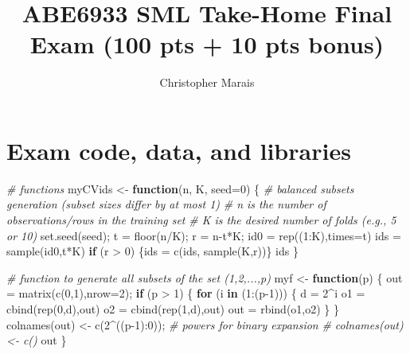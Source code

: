 \documentclass[
  11pt,
]{article}
\title{ABE6933 SML Take-Home Final Exam (100 pts + 10 pts bonus)}
\author{Christopher Marais}
\date{}
\newenvironment{Shaded}{\begin{snugshade}}{\end{snugshade}}
\newcommand{\AttributeTok}[1]{\textcolor[rgb]{0.77,0.63,0.00}{#1}}
\newcommand{\CommentTok}[1]{\textcolor[rgb]{0.56,0.35,0.01}{\textit{#1}}}
\newcommand{\ControlFlowTok}[1]{\textcolor[rgb]{0.13,0.29,0.53}{\textbf{#1}}}
\newcommand{\DecValTok}[1]{\textcolor[rgb]{0.00,0.00,0.81}{#1}}
\newcommand{\FunctionTok}[1]{\textcolor[rgb]{0.00,0.00,0.00}{#1}}
\newcommand{\NormalTok}[1]{#1}
\newcommand{\OtherTok}[1]{\textcolor[rgb]{0.56,0.35,0.01}{#1}}
\newcommand{\SpecialCharTok}[1]{\textcolor[rgb]{0.00,0.00,0.00}{#1}}
\begin{document}
\maketitle

\hypertarget{exam-code-data-and-libraries}{%
\section{Exam code, data, and
libraries}\label{exam-code-data-and-libraries}}

\begin{Shaded}
\begin{Highlighting}[]
\CommentTok{\# functions}
\NormalTok{myCVids }\OtherTok{\textless{}{-}} \ControlFlowTok{function}\NormalTok{(n, K, }\AttributeTok{seed=}\DecValTok{0}\NormalTok{) \{}
\CommentTok{\# balanced subsets generation (subset sizes differ by at most 1)}
\CommentTok{\# n is the number of observations/rows in the training set}
\CommentTok{\# K is the desired number of folds (e.g., 5 or 10)}
\FunctionTok{set.seed}\NormalTok{(seed);}
\NormalTok{t }\OtherTok{=} \FunctionTok{floor}\NormalTok{(n}\SpecialCharTok{/}\NormalTok{K); r }\OtherTok{=}\NormalTok{ n}\SpecialCharTok{{-}}\NormalTok{t}\SpecialCharTok{*}\NormalTok{K;}
\NormalTok{id0 }\OtherTok{=} \FunctionTok{rep}\NormalTok{((}\DecValTok{1}\SpecialCharTok{:}\NormalTok{K),}\AttributeTok{times=}\NormalTok{t)}
\NormalTok{ids }\OtherTok{=} \FunctionTok{sample}\NormalTok{(id0,t}\SpecialCharTok{*}\NormalTok{K)}
\ControlFlowTok{if}\NormalTok{ (r }\SpecialCharTok{\textgreater{}} \DecValTok{0}\NormalTok{) \{ids }\OtherTok{=} \FunctionTok{c}\NormalTok{(ids, }\FunctionTok{sample}\NormalTok{(K,r))\}}
\NormalTok{ids}
\NormalTok{\}}

\CommentTok{\# function to generate all subsets of the set (1,2,...,p)}
\NormalTok{myf }\OtherTok{\textless{}{-}} \ControlFlowTok{function}\NormalTok{(p) \{}
\NormalTok{  out }\OtherTok{=} \FunctionTok{matrix}\NormalTok{(}\FunctionTok{c}\NormalTok{(}\DecValTok{0}\NormalTok{,}\DecValTok{1}\NormalTok{),}\AttributeTok{nrow=}\DecValTok{2}\NormalTok{);}
  \ControlFlowTok{if}\NormalTok{ (p }\SpecialCharTok{\textgreater{}} \DecValTok{1}\NormalTok{) \{}
    \ControlFlowTok{for}\NormalTok{ (i }\ControlFlowTok{in}\NormalTok{ (}\DecValTok{1}\SpecialCharTok{:}\NormalTok{(p}\DecValTok{{-}1}\NormalTok{))) \{}
\NormalTok{      d }\OtherTok{=} \DecValTok{2}\SpecialCharTok{\^{}}\NormalTok{i}
\NormalTok{      o1 }\OtherTok{=} \FunctionTok{cbind}\NormalTok{(}\FunctionTok{rep}\NormalTok{(}\DecValTok{0}\NormalTok{,d),out)}
\NormalTok{      o2 }\OtherTok{=} \FunctionTok{cbind}\NormalTok{(}\FunctionTok{rep}\NormalTok{(}\DecValTok{1}\NormalTok{,d),out)}
\NormalTok{      out }\OtherTok{=} \FunctionTok{rbind}\NormalTok{(o1,o2)}
\NormalTok{    \}}
\NormalTok{  \}}
  \FunctionTok{colnames}\NormalTok{(out) }\OtherTok{\textless{}{-}} \FunctionTok{c}\NormalTok{(}\DecValTok{2}\SpecialCharTok{\^{}}\NormalTok{((p}\DecValTok{{-}1}\NormalTok{)}\SpecialCharTok{:}\DecValTok{0}\NormalTok{)); }\CommentTok{\# powers for binary expansion}
  \CommentTok{\# colnames(out) \textless{}{-} c()}
\NormalTok{  out}
\NormalTok{\}}


\end{Highlighting}
\end{Shaded}
\end{document}
